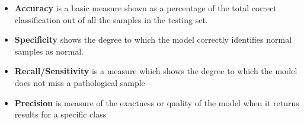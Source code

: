\begin{itemize}
	
	\item \textbf{Accuracy} is a basic measure shown as a percentage of the total correct classification out of all the samples in the testing set.
	\item \textbf{Specificity} shows the degree to which the model correctly identifies normal samples as normal. 
	\item \textbf{Recall/Sensitivity} is a measure which shows the degree to which the model does not miss a pathological sample
	\item \textbf{Precision} is measure of the exactness or quality of the model when it returns results for a specific class
	
	
\end{itemize}




